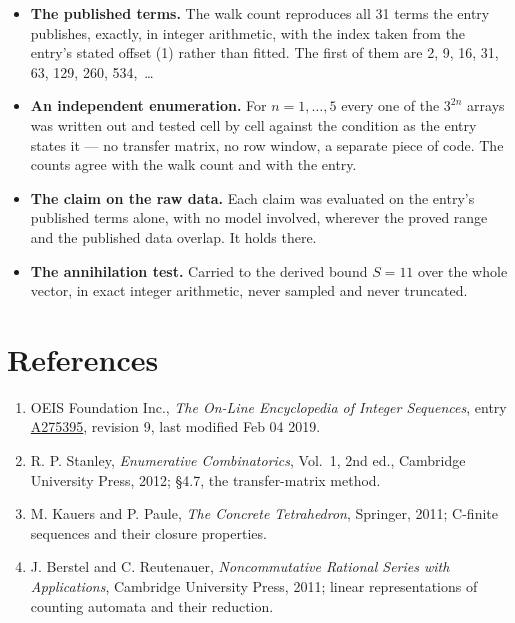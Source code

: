 \documentclass[11pt]{article}
\theoremstyle{definition}
\begin{document}
\begin{itemize}

\item {\bfseries The published terms.} The walk count reproduces all 31 terms the entry publishes, exactly, in integer arithmetic, with the index taken from the entry's stated offset (1) rather than fitted. The first of them are 2, 9, 16, 31, 63, 129, 260, 534,~\dots

\item {\bfseries An independent enumeration.} For $n = 1,\dots,5$ every one of the $3^{2n}$ arrays was written out and tested cell by cell against the condition as the entry states it --- no transfer matrix, no row window, a separate piece of code. The counts agree with the walk count and with the entry.

\item {\bfseries The claim on the raw data.} Each claim was evaluated on the entry's published terms alone, with no model involved, wherever the proved range and the published data overlap. It holds there.

\item {\bfseries The annihilation test.} Carried to the derived bound $S = 11$ over the whole vector, in exact integer arithmetic, never sampled and never truncated.

\end{itemize}

\section{References}

\begin{enumerate}

\item OEIS Foundation Inc., \emph{The On-Line Encyclopedia of Integer Sequences}, entry \href{https://oeis.org/A275395}{A275395}, revision 9, last modified Feb 04 2019.

\item R. P. Stanley, \emph{Enumerative Combinatorics}, Vol.~1, 2nd ed., Cambridge University Press, 2012; \S4.7, the transfer-matrix method.

\item M. Kauers and P. Paule, \emph{The Concrete Tetrahedron}, Springer, 2011; C-finite sequences and their closure properties.

\item J. Berstel and C. Reutenauer, \emph{Noncommutative Rational Series with Applications}, Cambridge University Press, 2011; linear representations of counting automata and their reduction.

\end{enumerate}
\end{document}
